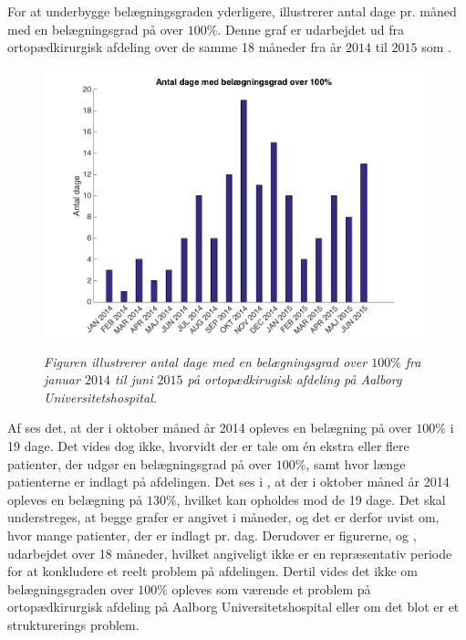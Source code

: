 For at underbygge belægningsgraden yderligere, illustrerer  antal dage pr. måned med en belægningsgrad på over $100 \%$. Denne graf er udarbejdet ud fra ortopædkirurgisk afdeling over de samme 18 måneder fra år $2014$ til $2015$ som . \cite{SDS2015} 

\begin{figure}[H]
	\flushleft 
	\centering
	\includegraphics[scale=.7]{figures/antaldage.png}
	\label{antaldage}
	\flushleft
	\caption{\textit{Figuren illustrerer antal dage med en belægningsgrad over $100 \%$ fra januar 			$2014$ til juni $2015$ på ortopædkirugisk afdeling på Aalborg Universitetshospital. 					\cite{SDS2015}}}
\end{figure}

\noindent
Af  ses det, at der i oktober måned år 2014 opleves en belægning på over $100 \%$ i 19 dage. Det vides dog ikke, hvorvidt der er tale om én ekstra eller flere patienter, der udgør en belægningsgrad på over $100 \%$, samt hvor længe patienterne er indlagt på afdelingen. Det ses i , at der i oktober måned år 2014 opleves en belægning på $130 \%$, hvilket kan opholdes mod de 19 dage. Det skal understreges, at begge grafer er angivet i måneder, og det er derfor uvist om, hvor mange patienter, der er indlagt pr. dag. Derudover er figurerne,  og , udarbejdet over 18 måneder, hvilket angiveligt ikke er en repræsentativ periode for at konkludere et reelt problem på afdelingen. Dertil vides det ikke om belægningsgraden over $100 \%$ opleves som værende et problem på ortopædkirurgisk afdeling på Aalborg Universitetshospital eller om det blot er et strukturerings problem. 
